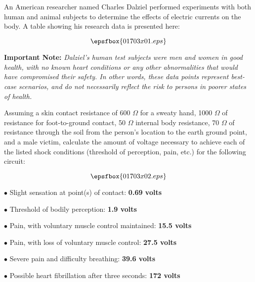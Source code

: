 

An American researcher named Charles Dalziel performed experiments with both human and animal subjects to determine the effects of electric currents on the body.  A table showing his research data is presented here:

$$\epsfbox{01703x01.eps}$$

{\bf Important Note:} {\it Dalziel's human test subjects were men and women in good health, with no known heart conditions or any other abnormalities that would have compromised their safety.  In other words, these data points represent best-case scenarios, and do not necessarily reflect the risk to persons in poorer states of health.}

\vskip 10pt

Assuming a skin contact resistance of 600 $\Omega$ for a sweaty hand, 1000 $\Omega$ of resistance for foot-to-ground contact, 50 $\Omega$ internal body resistance, 70 $\Omega$ of resistance through the soil from the person's location to the earth ground point, and a male victim, calculate the amount of voltage necessary to achieve each of the listed shock conditions (threshold of perception, pain, etc.) for the following circuit:

$$\epsfbox{01703x02.eps}$$







\medskip
\item{$\bullet$} Slight sensation at point(s) of contact: {\bf 0.69 volts}
\item{$\bullet$} Threshold of bodily perception: {\bf 1.9 volts}
\item{$\bullet$} Pain, with voluntary muscle control maintained: {\bf 15.5 volts}
\item{$\bullet$} Pain, with loss of voluntary muscle control: {\bf 27.5 volts}
\item{$\bullet$} Severe pain and difficulty breathing: {\bf 39.6 volts}
\item{$\bullet$} Possible heart fibrillation after three seconds: {\bf 172 volts}
\medskip







